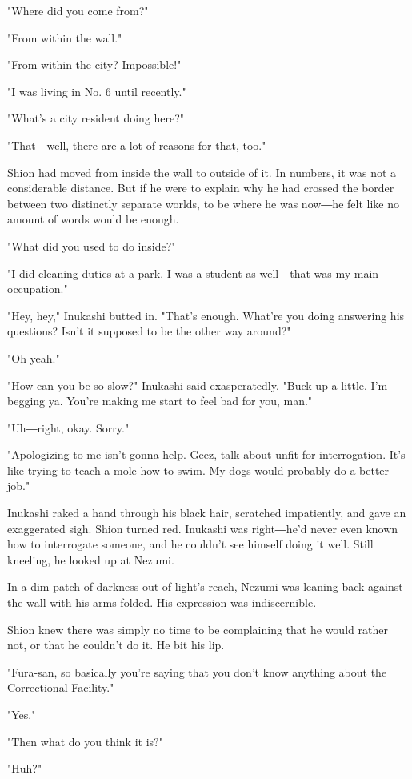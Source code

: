 "Where did you come from?"

"From within the wall."

"From within the city? Impossible!"

"I was living in No. 6 until recently."

"What's a city resident doing here?"

"That―well, there are a lot of reasons for that, too."

Shion had moved from inside the wall to outside of it. In numbers, it
was not a considerable distance. But if he were to explain why he had
crossed the border between two distinctly separate worlds, to be where
he was now―he felt like no amount of words would be enough.

"What did you used to do inside?"

"I did cleaning duties at a park. I was a student as well―that was my
main occupation."

"Hey, hey," Inukashi butted in. "That's enough. What're you doing
answering his questions? Isn't it supposed to be the other way around?"

"Oh yeah."

"How can you be so slow?" Inukashi said exasperatedly. "Buck up a
little, I'm begging ya. You're making me start to feel bad for you,
man."

"Uh―right, okay. Sorry."

"Apologizing to me isn't gonna help. Geez, talk about unfit for
interrogation. It's like trying to teach a mole how to swim. My dogs
would probably do a better job."

Inukashi raked a hand through his black hair, scratched impatiently, and
gave an exaggerated sigh. Shion turned red. Inukashi was right―he'd
never even known how to interrogate someone, and he couldn't see himself
doing it well. Still kneeling, he looked up at Nezumi.

In a dim patch of darkness out of light's reach, Nezumi was leaning back
against the wall with his arms folded. His expression was indiscernible.

Shion knew there was simply no time to be complaining that he would
rather not, or that he couldn't do it. He bit his lip.

"Fura-san, so basically you're saying that you don't know anything about
the Correctional Facility."

"Yes."

"Then what do you think it is?"

"Huh?"

